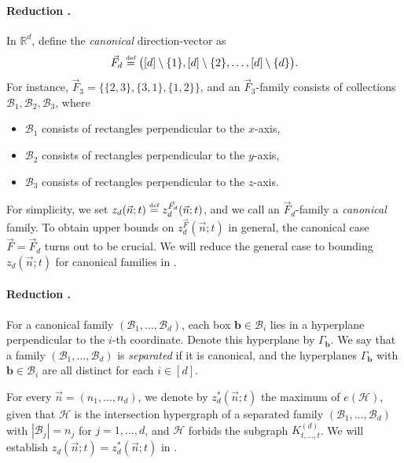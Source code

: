 \documentclass[11pt]{article}
\theoremstyle{definition}
\newcommand*{\eqdef}{\stackrel{\mbox{\normalfont\tiny def}}{=}} %
\newcommand*{\R}{\mathbb{R}}                                    %
\newcommand*{\cH}{\mathcal{H}}
\newcommand*{\vF}{\vec{F}}
\newcommand*{\cB}{\mathcal{B}}
\newcommand*{\vn}{\vec{n}}
\begin{document}
\paragraph{Reduction \texorpdfstring{{\MakeUppercase{}}}{I}.} In $\R^d$, define the \emph{canonical} direction-vector as
\[
\vF_d \eqdef \bigl( [d] \setminus \{1\}, [d] \setminus \{2\}, \dots, [d] \setminus \{d\} \bigr). 
\]
For instance, $\vF_3 = \bigl\{ \{2, 3\}, \{3, 1\}, \{1, 2\} \bigr\}$, and an $\vF_3$-family consists of collections $\cB_1, \cB_2, \cB_3$, where
\vspace{-0.5em}
\begin{itemize}
    \item $\cB_1$ consists of rectangles perpendicular to the $x$-axis, 
    \vspace{-0.5em}
    \item $\cB_2$ consists of rectangles perpendicular to the $y$-axis, 
    \vspace{-0.5em}
    \item $\cB_3$ consists of rectangles perpendicular to the $z$-axis. 
\end{itemize}
\vspace{-0.5em}

For simplicity, we set $z_d(\vn; t) \eqdef z_d^{\vF_d}(\vn; t)$, and we call an $\vF_d$-family a \emph{canonical} family. 
To obtain upper bounds on $z_d^{\vF}(\vn; t)$ in general, the canonical case $\vF = \vF_d$ turns out to be crucial. We will reduce the general case to bounding $z_d(\vn; t)$ for canonical families in .

\paragraph{Reduction \texorpdfstring{{\MakeUppercase{}}}{II}.} 
For a canonical family $(\cB_1, \dots, \cB_d)$, each box $\bm{b}\in \cB_i$ lies in a hyperplane perpendicular to the $i$-th coordinate. Denote this hyperplane by $\Gamma_{\bm{b}}$. We say that a family $(\cB_1, \dots, \cB_d)$ is \emph{separated} if it is canonical, and the hyperplanes $\Gamma_{\bm{b}}$ with $\bm{b} \in \cB_i$ are all distinct for each $i \in [d]$. 

For every $\vn = (n_1, \dots, n_d)$, we denote by $z_d^*(\vn; t)$ the maximum of $e(\cH)$, given that $\cH$ is the intersection hypergraph of a separated family $(\cB_1, \dots, \cB_d)$ with $|\cB_j| = n_j$ for $j = 1, \dots, d$, and $\cH$ forbids the subgraph $K_{t, \dots, t}^{(d)}$. 
We will establish $z_d(\vn; t) = z_d^*(\vn; t)$ in .
\end{document}

